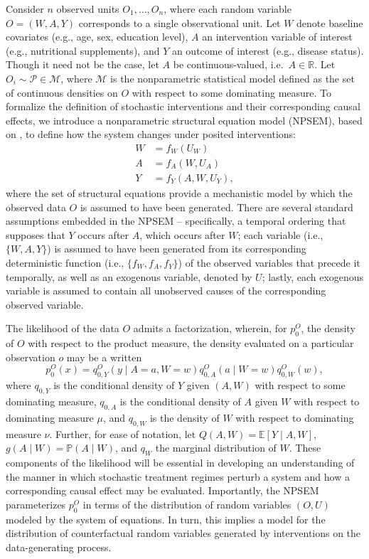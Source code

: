 \documentclass[
  12pt, krantz2,
]{krantz}
\theoremstyle{definition}
\theoremstyle{definition}
\theoremstyle{definition}
\renewcommand{\P}{\mathbb{P}}
\newcommand{\R}{\mathbb{R}}
\newcommand{\E}{\mathbb{E}}
\newcommand{\M}{\mathcal{M}}
\newcommand{\1}{\mathbbm{1}}
\begin{document}
Consider \(n\) observed units \(O_1, \ldots, O_n\), where each random variable \(O = (W, A, Y)\) corresponds to a single observational unit. Let \(W\) denote baseline
covariates (e.g., age, sex, education level), \(A\) an intervention variable of
interest (e.g., nutritional supplements), and \(Y\) an outcome of interest (e.g.,
disease status). Though it need not be the case, let \(A\) be continuous-valued,
i.e.~\(A \in \R\). Let \(O_i \sim \mathcal{P} \in \M\), where \(\M\) is the
nonparametric statistical model defined as the set of continuous densities on
\(O\) with respect to some dominating measure. To formalize the definition of
stochastic interventions and their corresponding causal effects, we introduce a
nonparametric structural equation model (NPSEM), based on \citet{pearl2009causality},
to define how the system changes under posited interventions:
\begin{align}
  W &= f_W(U_W) \\ A &= f_A(W, U_A) \\ Y &= f_Y(A, W, U_Y),
  \label{eq:npsem-shift}
\end{align}
where the set of structural equations provide a mechanistic model by which the
observed data \(O\) is assumed to have been generated. There are several standard
assumptions embedded in the NPSEM -- specifically, a temporal ordering that
supposes that \(Y\) occurs after \(A\), which occurs after \(W\); each variable (i.e.,
\(\{W, A, Y\}\)) is assumed to have been generated from its corresponding
deterministic function (i.e., \(\{f_W, f_A, f_Y\}\)) of the observed variables
that precede it temporally, as well as an exogenous variable, denoted by \(U\);
lastly, each exogenous variable is assumed to contain all unobserved causes of
the corresponding observed variable.

The likelihood of the data \(O\) admits a factorization, wherein, for \(p_0^O\),
the density of \(O\) with respect to the product measure, the density evaluated
on a particular observation \(o\) may be a written
\begin{equation}
  p_0^O(x) = q^O_{0,Y}(y \mid A = a, W = w) q^O_{0,A}(a \mid W = w)
  q^O_{0,W}(w),
  \label{eq:likelihood-factorization-shift}
\end{equation}
where \(q_{0, Y}\) is the conditional density of \(Y\) given \((A, W)\) with respect
to some dominating measure, \(q_{0, A}\) is the conditional density of \(A\) given
\(W\) with respect to dominating measure \(\mu\), and \(q_{0, W}\) is the density of
\(W\) with respect to dominating measure \(\nu\). Further, for ease of notation, let
\(Q(A, W) = \E[Y \mid A, W]\), \(g(A \mid W) = \P(A \mid W)\), and \(q_W\) the
marginal distribution of \(W\). These components of the likelihood will be
essential in developing an understanding of the manner in which stochastic
treatment regimes perturb a system and how a corresponding causal effect may be
evaluated. Importantly, the NPSEM parameterizes \(p_0^O\) in terms of the
distribution of random variables \((O, U)\) modeled by the system of equations. In
turn, this implies a model for the distribution of counterfactual random
variables generated by interventions on the data-generating process.
\end{document}
